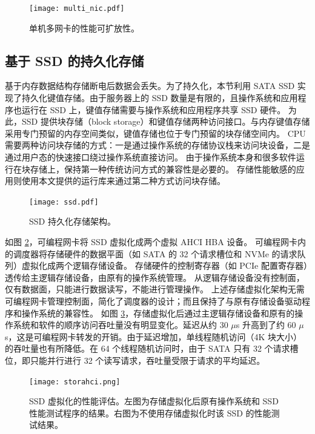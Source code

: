 \begin{figure}[htbp]
	\centering
	\texttt{[image: multi\_nic.pdf]}
	\caption{单机多网卡的性能可扩放性。}
	\label{kvdirect:fig:multiple-nics}
\end{figure}


\subsection{基于 SSD 的持久化存储}

基于内存数据结构存储断电后数据会丢失。为了持久化，本节利用 SATA SSD 实现了持久化键值存储。由于服务器上的 SSD 数量是有限的，且操作系统和应用程序也运行在 SSD 上，键值存储需要与操作系统和应用程序共享 SSD 硬件。
为此，SSD 提供块存储（block storage）和键值存储两种访问接口。与内存键值存储采用专门预留的内存空间类似，键值存储也位于专门预留的块存储空间内。
CPU 需要两种访问块存储的方式：一是通过操作系统的存储协议栈来访问块设备，二是通过用户态的快速接口绕过操作系统直接访问。
由于操作系统本身和很多软件运行在块存储上，保持第一种传统访问方式的兼容性是必要的。
存储性能敏感的应用则使用本文提供的运行库来通过第二种方式访问块存储。


\begin{figure}[htbp]
	\centering
	\texttt{[image: ssd.pdf]}
	\caption{SSD 持久化存储架构。}
	\label{kvdirect:fig:ssd}
\end{figure}

如图 \ref{kvdirect:fig:ssd}，可编程网卡将 SSD 虚拟化成两个虚拟 AHCI HBA 设备。
可编程网卡内的调度器将存储硬件的数据平面（如 SATA 的 32 个请求槽位和 NVMe 的请求队列）虚拟化成两个逻辑存储设备。
存储硬件的控制寄存器（如 PCIe 配置寄存器）透传给主逻辑存储设备，由原有的操作系统管理。
从逻辑存储设备没有控制面，仅有数据面，只能进行数据读写，不能进行管理操作。
上述存储虚拟化架构无需可编程网卡管理控制面，简化了调度器的设计；而且保持了与原有存储设备驱动程序和操作系统的兼容性。
如图 \ref{kvdirect:fig:ssd-benchmark}，存储虚拟化后通过主逻辑存储设备和原有的操作系统和软件的顺序访问吞吐量没有明显变化。延迟从约 30 $\mu$s 升高到了约 60 $\mu$s，这是可编程网卡转发的开销。由于延迟增加，单线程随机访问（4K 块大小）的吞吐量也有所降低。在 64 个线程随机访问时，由于 SATA 只有 32 个请求槽位，即只能并行进行 32 个读写请求，吞吐量受限于请求的平均延迟。

\begin{figure}[htbp]
	\centering
	\texttt{[image: storahci.png]}
	\caption{SSD 虚拟化的性能评估。左图为存储虚拟化后原有操作系统和 SSD 性能测试程序的结果。右图为不使用存储虚拟化时该 SSD 的性能测试结果。}
	\label{kvdirect:fig:ssd-benchmark}
\end{figure}

